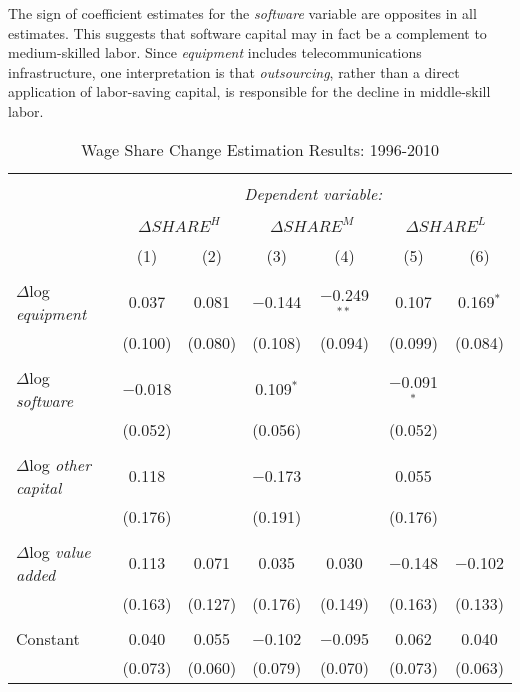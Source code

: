 The sign of coefficient estimates for the {\em software} variable are opposites in all estimates. This suggests that software capital may in fact be a complement to medium-skilled labor. Since {\em equipment} includes telecommunications infrastructure, one interpretation is that {\em outsourcing}, rather than a direct application of labor-saving capital, is responsible for the decline in middle-skill labor.

\begin{sidewaystable} \begin{center}
  \caption{Wage Share Change Estimation Results: 1996-2010} 
  \label{tbl:reg} 
\begin{tabular}{@{\extracolsep{5pt}}lcccccc} 
\\[-1.8ex]\hline 
\hline \\[-1.8ex] 
 & \multicolumn{6}{c}{\textit{Dependent variable:}} \\ 
\cline{2-7} 
\\[-1.8ex] & \multicolumn{2}{c}{$\Delta SHARE^H$} & \multicolumn{2}{c}{$\Delta SHARE^M$} & \multicolumn{2}{c}{$\Delta SHARE^L$} \\ 
\\[-1.8ex] & (1) & (2) & (3) & (4) & (5) & (6)\\ 
\hline \\[-1.8ex] 
 $\Delta$log {\em equipment} & 0.037 & 0.081 & $-$0.144 & $-$0.249$^{**}$ & 0.107 & 0.169$^{*}$ \\ 
  & (0.100) & (0.080) & (0.108) & (0.094) & (0.099) & (0.084) \\ 
  & & & & & & \\ 
 $\Delta$log {\em software} & $-$0.018 &  & 0.109$^{*}$ &  & $-$0.091$^{*}$ &  \\ 
  & (0.052) &  & (0.056) &  & (0.052) &  \\ 
  & & & & & & \\ 
 $\Delta$log {\em other capital} & 0.118 &  & $-$0.173 &  & 0.055 &  \\ 
  & (0.176) &  & (0.191) &  & (0.176) &  \\ 
  & & & & & & \\ 
 $\Delta$log {\em value added} & 0.113 & 0.071 & 0.035 & 0.030 & $-$0.148 & $-$0.102 \\ 
  & (0.163) & (0.127) & (0.176) & (0.149) & (0.163) & (0.133) \\ 
  & & & & & & \\ 
 Constant & 0.040 & 0.055 & $-$0.102 & $-$0.095 & 0.062 & 0.040 \\ 
  & (0.073) & (0.060) & (0.079) & (0.070) & (0.073) & (0.063) \\ 

\end{tabular}
\end{center}
\end{sidewaystable}
